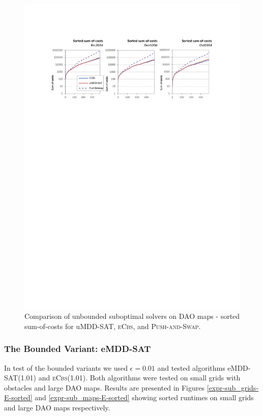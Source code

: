 \documentclass[jair,oneside,11pt]{article}
\begin{document}
\begin{figure}[h]
\centering
\includegraphics[trim={2.5cm 20.0cm 2.5cm 2.5cm},clip,width=\textwidth]{expr-sub_maps-U-soc-sorted.pdf}
\vspace{-0.8cm}
\caption{Comparison of unbounded suboptimal solvers on DAO maps - sorted sum-of-costs for uMDD-SAT, \textsc{eCbs}, and \textsc{Push-and-Swap}.}
\label{expr-sub_maps-U-soc-sorted}
\end{figure}

\subsubsection{The Bounded Variant: eMDD-SAT}

In test of the bounded variants we used $\epsilon = 0.01$ and tested algorithms eMDD-SAT(1.01) and \textsc{eCbs}(1.01). Both algorithms were tested on small grids with obstacles and large DAO maps. Results are presented in Figures \ref{expr-sub_grids-E-sorted} and \ref{expr-sub_maps-E-sorted} showing sorted runtimes on small grids and large DAO maps respectively.
\end{document}
